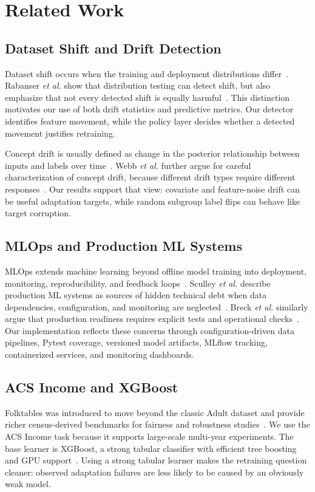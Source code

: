\documentclass[conference]{IEEEtran}
\begin{document}
\section{Related Work}
\subsection{Dataset Shift and Drift Detection}
Dataset shift occurs when the training and deployment distributions differ~\cite{quionero2009dataset}. Rabanser \emph{et al.} show that distribution testing can detect shift, but also emphasize that not every detected shift is equally harmful~\cite{rabanser2019failing}. This distinction motivates our use of both drift statistics and predictive metrics. Our detector identifies feature movement, while the policy layer decides whether a detected movement justifies retraining.

Concept drift is usually defined as change in the posterior relationship between inputs and labels over time~\cite{gama2014survey,lu2019learning}. Webb \emph{et al.} further argue for careful characterization of concept drift, because different drift types require different responses~\cite{webb2016characterizing}. Our results support that view: covariate and feature-noise drift can be useful adaptation targets, while random subgroup label flips can behave like target corruption.

\subsection{MLOps and Production ML Systems}
MLOps extends machine learning beyond offline model training into deployment, monitoring, reproducibility, and feedback loops~\cite{kreuzberger2023mlops}. Sculley \emph{et al.} describe production ML systems as sources of hidden technical debt when data dependencies, configuration, and monitoring are neglected~\cite{sculley2015debt}. Breck \emph{et al.} similarly argue that production readiness requires explicit tests and operational checks~\cite{breck2017mltest}. Our implementation reflects these concerns through configuration-driven data pipelines, Pytest coverage, versioned model artifacts, MLflow tracking, containerized services, and monitoring dashboards.

\subsection{ACS Income and XGBoost}
Folktables was introduced to move beyond the classic Adult dataset and provide richer census-derived benchmarks for fairness and robustness studies~\cite{ding2021retiring}. We use the ACS Income task because it supports large-scale multi-year experiments. The base learner is XGBoost, a strong tabular classifier with efficient tree boosting and GPU support~\cite{chen2016xgboost}. Using a strong tabular learner makes the retraining question cleaner: observed adaptation failures are less likely to be caused by an obviously weak model.
\end{document}
